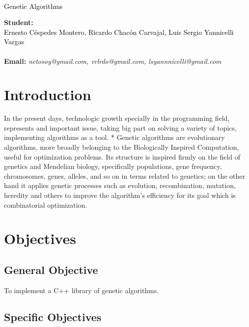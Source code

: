 \documentclass[letterpaper]{article}
\newcommand{\uic}{black} %
\newcommand{\uim}{\\} %
\newcommand{\userinput}[1]{\textcolor{\uic}{\uim#1\uim}}
\begin{document}
\vspace*{2cm}

\begin{center}
\Huge
\userinput{Genetic Algorithms}
\vspace*{1cm}
\end{center}

\noindent
\small\baselineskip=14pt
\textbf{Student:} \userinput{Ernesto Céspedes Montero, Ricardo Chacón Carvajal, Luis Sergio Yannicelli Vargas}\\
\textbf{Email:} \textit{netosoy@gmail.com, vrlrdo@gmail.com, lsyannnicelli@gmail.com}\\

\section{Introduction}
In the present days, technologic growth specially in the programming field, represents and important issue, taking big part on solving a variety of topics, implementing algorithms as a tool. * Genetic algorithms are evolutionary algorithms, more broadly belonging to the Biologically Inspired Computation, useful for optimization problems. Its structure is inspired firmly on the field of genetics and Mendelian biology, specifically populations, gene frequency, chromosomes, genes, alleles, and so on in terms related to genetics; on the other hand it applies genetic processes such as evolution, recombination, mutation, heredity and others to improve the algorithm's efficiency for its goal which is combinatorial optimization.

\section{Objectives}

\subsection{General Objective}

To implement a C++ library of genetic algorithms.

\subsection{Specific Objectives}
\end{document}
